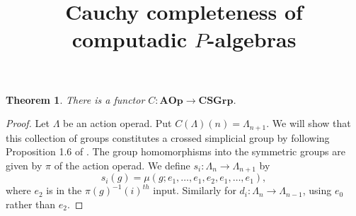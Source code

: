 \documentclass[11pt]{article}
\title{Cauchy completeness of computadic $P$-algebras}
\date{}
\theoremstyle{definition}
\theoremstyle{plain}
\newtheorem{theorem}[definition]{Theorem}
\begin{document}
\begin{theorem}
There is a functor $C \colon \mathbf{AOp} \rightarrow \mathbf{CSGrp}$.
\end{theorem}
\begin{proof}
    Let $\Lambda$ be an action operad. Put $C(\Lambda)(n) = \Lambda_{n+1}$. We will show that this collection of groups constitutes a crossed simplicial group by following Proposition 1.6 of \cite{FL91}. The group homomorphisms into the symmetric groups are given by $\pi$ of the action operad. We define $s_i \colon \Lambda_{n} \rightarrow \Lambda_{n+1}$ by
        \[
            s_i(g) = \mu(g; e_1, \ldots, e_1, e_2, e_1, \ldots, e_1),
        \]
    where $e_2$ is in the $\pi(g)^{-1}(i)^{th}$ input. Similarly for $d_i \colon \Lambda_{n} \rightarrow \Lambda_{n-1}$, using $e_0$ rather than $e_2$.
    

\end{proof}
\end{document}
